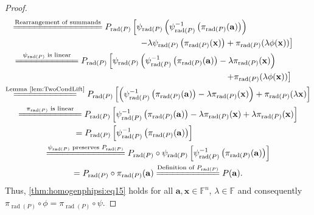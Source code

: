 \documentclass{elsarticle}
\DeclareMathOperator{\rad}{rad}
\def\F{{\mathbb F}}
\theoremstyle{definition}
\numberwithin{equation}{section}
\begin{document}
\begin{proof}
{\begin{multline*}
\overset{\scriptsize\mbox{Rearrangement of summands}}{=\joinrel=\joinrel=\joinrel=\joinrel=\joinrel=\joinrel=\joinrel=\joinrel=\joinrel=\joinrel=\joinrel=\joinrel=\joinrel=\joinrel=\joinrel=\joinrel=}
P_{\rad(P)} \left[\psi_{\rad(P)}\left(\psi_{\rad(P)}^{-1}\left(\pi_{\rad(P)}(\mathbf a)\right)\right)\right.\phantom{XXXXXXX}\\\phantom{XXXXXXXXXXXXXXX}\left. - \lambda \psi_{\rad(P)}\left(\pi_{\rad(P)}(\mathbf x)\right) + \pi_{\rad(P)}( \lambda \phi(\mathbf x)) \right]\\
\overset{\scriptsize\mbox{$\psi_{\rad(P)}$ is linear}}{=\joinrel=\joinrel=\joinrel=\joinrel=\joinrel=\joinrel=\joinrel=\joinrel=\joinrel=\joinrel=\joinrel=}
P_{\rad(P)} \left[\psi_{\rad(P)}\left(\psi_{\rad(P)}^{-1}\left(\pi_{\rad(P)}(\mathbf a)\right) - \lambda \pi_{\rad(P)}(\mathbf x)\right)\right.\phantom{XXX}\\\phantom{XXXXXXXXXXXXXXXXXXXXXXXXXX}\left. + \pi_{\rad(P)}( \lambda \phi(\mathbf x)) \right]\\
\overset{\scriptsize\mbox{Lemma~\ref{lem:TwoCondLift}}}{=\joinrel=\joinrel=\joinrel=\joinrel=\joinrel=\joinrel=\joinrel=\joinrel=\joinrel=\joinrel=\joinrel=}
P_{\rad(P)} \left[\left(\psi_{\rad(P)}^{-1}\left(\pi_{\rad(P)}(\mathbf a)\right) - \lambda \pi_{\rad(P)}(\mathbf x)\right) + \pi_{\rad(P)}( \lambda \mathbf x) \right]\\
\overset{\scriptsize\mbox{$\pi_{\rad(P)}$ is linear}}{=\joinrel=\joinrel=\joinrel=\joinrel=\joinrel=\joinrel=\joinrel=\joinrel=\joinrel=\joinrel=\joinrel=}
P_{\rad(P)} \left[\psi_{\rad(P)}^{-1}\left(\pi_{\rad(P)}(\mathbf a)\right) - \lambda \pi_{\rad(P)}(\mathbf x) + \lambda \pi_{\rad(P)}( \mathbf x) \right]\\ 
=P_{\rad(P)} \left[\psi_{\rad(P)}^{-1}\left(\pi_{\rad(P)}(\mathbf a)\right) \right]\phantom{XXXXXX}\\
\overset{\scriptsize\mbox{$\psi_{\rad(P)}$ preserves $P_{\rad(P)}$}}{=\joinrel=\joinrel=\joinrel=\joinrel=\joinrel=\joinrel=\joinrel=\joinrel=\joinrel=\joinrel=\joinrel=\joinrel=\joinrel=\joinrel=}
P_{\rad(P)} \circ \psi_{\rad(P)} \left[\psi_{\rad(P)}^{-1}\left(\pi_{\rad(P)}(\mathbf a)\right) \right]\\
= P_{\rad(P)} \circ \pi_{\rad(P)}(\mathbf a)
\overset{\scriptsize\mbox{Definition of $P_{\rad(P)}$}}{=\joinrel=\joinrel=\joinrel=\joinrel=\joinrel=\joinrel=\joinrel=\joinrel=\joinrel=\joinrel=\joinrel=}
P(\mathbf a).
\end{multline*}}
Thus, \eqref{thm:homogenphipsi:eq15} holds for all $\mathbf a, \mathbf x \in \F^n$, $\lambda  \in \F$ and consequently $\pi_{\rad(P)} \circ \phi = \pi_{\rad(P)} \circ \psi$.

\end{proof}
\end{document}

